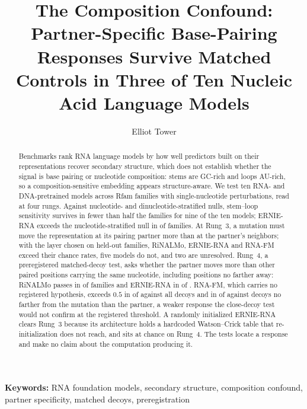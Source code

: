 \documentclass[11pt]{article}
\title{The Composition Confound:\\Partner-Specific Base-Pairing Responses Survive Matched\\Controls in Three of Ten Nucleic Acid Language Models}
\author{Elliot Tower}
\affil{\corraffil{} \\ \texttt{elliot@elliottower.ai}}
\date{}
\begin{document}
\maketitle

\noindent\textbf{Keywords:} RNA foundation models, secondary structure, composition confound, partner specificity, matched decoys, preregistration

\begin{abstract}
Benchmarks rank RNA language models by how well predictors built on their
representations recover secondary structure, which does not establish whether
the signal is base pairing or nucleotide composition: stems are GC-rich and
loops AU-rich, so a composition-sensitive embedding appears structure-aware. We
test ten RNA- and DNA-pretrained models across \panelN{} Rfam families with
single-nucleotide perturbations, read at four rungs. Against nucleotide- and
dinucleotide-stratified nulls, stem--loop sensitivity survives in fewer than
half the families for nine of the ten models; ERNIE-RNA exceeds the
nucleotide-stratified null in \exceedErnieRNA{} of \panelN{} families. At Rung~3, a mutation must move the
representation at its pairing partner more than at the partner's neighbors;
with the layer chosen on held-out families, RiNALMo, ERNIE-RNA and RNA-FM
exceed their chance rates, five models do not, and two are unresolved.
Rung~4, a preregistered matched-decoy test, asks whether the partner moves more
than other paired positions carrying the same nucleotide, including positions
no farther away: RiNALMo passes in \decoyAllAboveRiNALMo{} of
\decoyAllFamiliesRiNALMo{} families and ERNIE-RNA in \decoyAllAboveErnieRNA{}
of \decoyAllFamiliesErnieRNA{}. RNA-FM, which carries no registered
hypothesis, exceeds $0.5$ in \decoyAllAboveRNAFM{} of \decoyAllFamiliesRNAFM{}
against all decoys and in \decoyCloseAboveRNAFM{} of
\decoyCloseFamiliesRNAFM{} against decoys no farther from the mutation than the
partner, a weaker response the close-decoy test would not confirm at the
registered threshold. A randomly initialized
ERNIE-RNA clears Rung~3 because its architecture holds a hardcoded
Watson--Crick table that re-initialization does not reach, and sits at chance
on Rung~4. The tests locate a response and make no claim about the
computation producing it.
\end{abstract}
\end{document}
